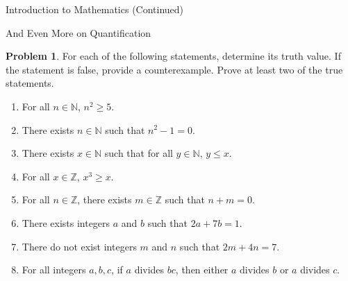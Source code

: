 \documentclass[11pt]{article}
\theoremstyle{definition}
\newtheorem{problem}[theorem]{Problem}
\begin{document}
\begin{section}{Introduction to Mathematics (Continued)}
\begin{subsection}{And Even More on Quantification}
\begin{problem}
For each of the following statements, determine its truth value.  If the statement is false, provide a counterexample.  Prove at least two of the true statements.
\begin{enumerate}
\item For all $n\in\mathbb{N}$, $n^2\geq 5$.

\item There exists $n \in \mathbb{N}$ such that $n^2-1=0$.


\item There exists $x \in \mathbb{N}$ such that for all $y \in \mathbb{N}$, $y \leq x$.

\item For all $x\in\mathbb{Z}$, $x^3\geq x$.

\item For all $n\in\mathbb{Z}$, there exists $m\in\mathbb{Z}$ such that $n+m=0$.

\item There exists integers $a$ and $b$ such that $2a+7b=1$.

\item There do not exist integers $m$ and $n$ such that $2m+4n=7$.

\item For all integers $a, b, c$, if $a$ divides $bc$, then either $a$ divides $b$ or $a$ divides $c$.



\end{enumerate}

\end{problem}

\end{subsection}

\end{section}
\end{document}
